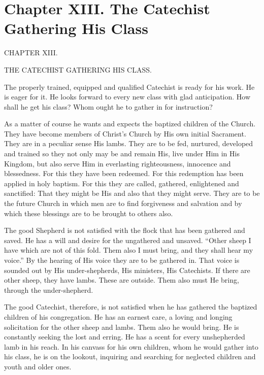 \chapter[Chapter XIII. Gathering His Class]{Chapter XIII. The Catechist Gathering His Class}

CHAPTER XIII.

THE CATECHIST GATHERING HIS CLASS.

The properly trained, equipped and qualified Catechist is ready for his work. He is eager for it. He looks forward to every new class with glad anticipation. How shall he get his class? Whom ought he to gather in for instruction?

 As a matter of course he wants and expects the baptized children of the Church. They have become members of Christ’s Church by His own initial Sacrament. They are in a peculiar sense His lambs. They are to be fed, nurtured, developed and trained so they not only may be and remain His, live under Him in His Kingdom, but also serve Him in everlasting righteousness, innocence and blessedness. For this they have been redeemed. For this redemption has been applied in holy baptism. For this they are called, gathered, enlightened and sanctified: That they might be His and also that they might serve. They are to be the future Church in which men are to find forgiveness and salvation and by which these blessings are to be brought to others also.

The good Shepherd is not satisfied with the flock that has been gathered and saved. He has a will
and desire for the ungathered and unsaved. “Other sheep I have which are not of this fold. Them also I must bring, and they shall hear my voice.” By the hearing of His voice they are to be gathered in. That voice is sounded out by His under-shepherds, His ministers, His Catechists. If there are other sheep, they have lambs. These are outside. Them also must He bring, through the under-shepherd.

 The good Catechist, therefore, is not satisfied when he has gathered the baptized children of his congregation. He has an earnest care, a loving and longing solicitation for the other sheep and lambs. Them also he would bring. He is constantly seeking the lost and erring. He has a scent for every unshepherded lamb in his reach. In his canvass for his own children, whom he would gather into his class, he is on the lookout, inquiring and searching for neglected children and youth and older ones.

